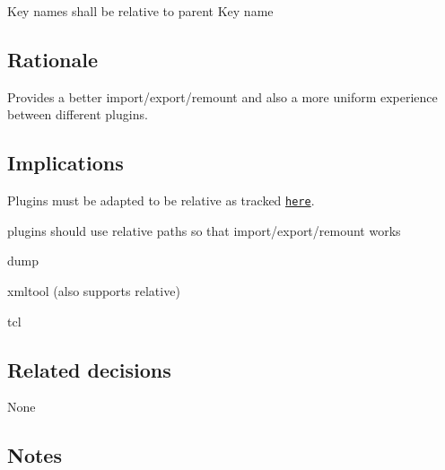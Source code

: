 Key names shall be relative to parent Key name

\subsection*{Rationale}

Provides a better import/export/remount and also a more uniform experience between different plugins.

\subsection*{Implications}

Plugins must be adapted to be relative as tracked \href{https://github.com/ElektraInitiative/libelektra/issues/51}{\tt here}.

plugins should use relative paths so that import/export/remount works


\begin{DoxyItemize}
\item dump
\item xmltool (also supports relative)
\item tcl
\end{DoxyItemize}

\subsection*{Related decisions}

None

\subsection*{Notes}